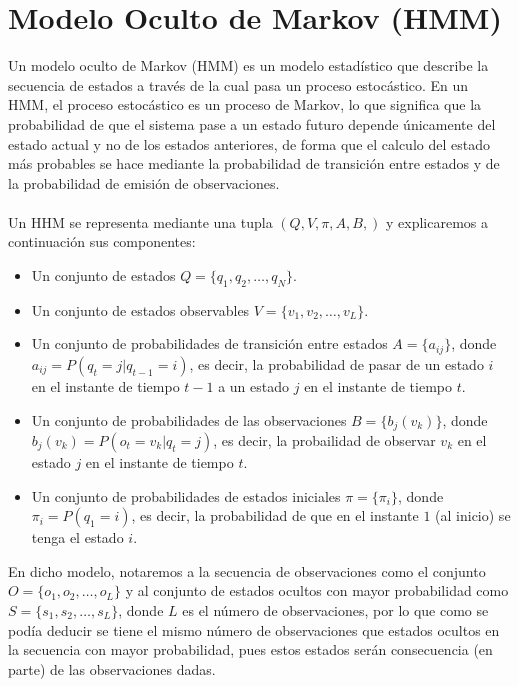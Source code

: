 \documentclass[11pt,openany]{book}
\begin{document}
\section{Modelo Oculto de Markov (HMM)}
Un modelo oculto de Markov (HMM) es un modelo estadístico que describe la secuencia de estados a través de la cual pasa un proceso estocástico. En un HMM, el proceso estocástico
es un proceso de Markov, lo que significa que la probabilidad de que el sistema pase a un estado futuro depende únicamente del estado actual y no de los estados anteriores, de forma que 
el calculo del estado más probables se hace mediante la probabilidad de transición entre estados y de la probabilidad de emisión de observaciones. \\ \\
Un HHM se representa mediante una tupla $(Q, V, \pi, A, B,)$ y explicaremos a continuación sus componentes:
\begin{itemize}
      \item Un conjunto de estados $Q = \{q_1, q_2, \ldots, q_N\}$.
      \item Un conjunto de estados observables $V = \{v_1, v_2, \ldots, v_L\}$.
      \item Un conjunto de probabilidades de transición entre estados $A = \{a_{ij}\}$, donde $a_{ij} = P(q_t = j | q_{t-1} = i)$, es decir, la probabilidad de 
      pasar de un estado $i$ en el instante de tiempo $t-1$ a un estado $j$ en el instante de tiempo $t$.
      \item Un conjunto de probabilidades de las observaciones $B = \{b_j(v_k)\}$, donde $b_j(v_k) = P(o_t = v_k | q_t = j)$, es decir, la probailidad de observar
      $v_k$ en el estado $j$ en el instante de tiempo $t$.
      \item Un conjunto de probabilidades de estados iniciales $\pi = \{\pi_i\}$, donde $\pi_i = P(q_1 = i)$, es decir, la probabilidad de que en el instante $1$ (al inicio) se tenga
      el estado $i$.
\end{itemize}
 
En dicho modelo, notaremos a la secuencia de observaciones como el conjunto $O=\{o_1, o_2, \ldots, o_L\}$ y al conjunto
de estados ocultos con mayor probabilidad como $S = \{s_1, s_2, \ldots, s_L\}$, donde $L$ es el número de observaciones, por lo que como se podía deducir se tiene
el mismo número de observaciones que estados ocultos en la secuencia con mayor probabilidad, pues estos estados serán consecuencia (en parte) de las observaciones dadas. \\ \\
\end{document}
